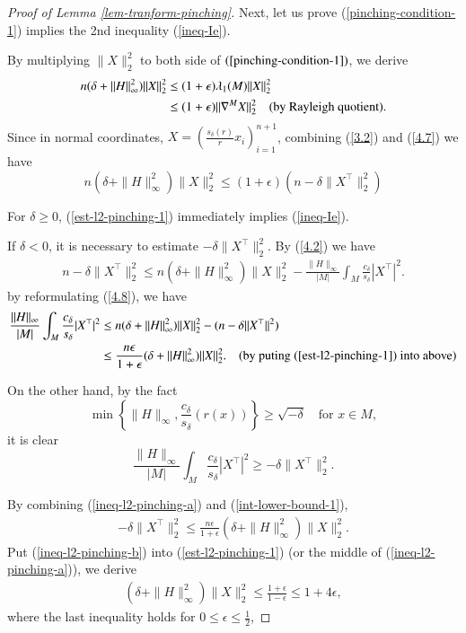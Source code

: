 \documentclass{amsart}
\numberwithin{equation}{section}
\theoremstyle{remark}
\renewcommand{\(}{\left(}
\renewcommand{\)}{\right)}
\renewcommand{\~}{\tilde}
\renewcommand{\-}{\overline}
\renewcommand{\d}{\delta}
\newcommand{\e}{\epsilon}
\renewcommand{\l}{\lambda}
\begin{document}
\begin{proof}[Proof of Lemma \ref{lem-tranform-pinching}]
	Next, let us prove (\ref{pinching-condition-1}) implies the 2nd inequality (\ref{ineq-Ie}).
	
	By multiplying $\|X\|_2^2$ to both side of $(\ref{pinching-condition-1})$, we derive
	\begin{align}
	n(\d+\|H\|_\infty^2)\|X\|_2^2 &\leq (1+\e)\l_1(M)\|X\|_2^2 \notag\\
	& \leq (1+\e)\|\nabla^M X\|_2^2 \quad (\text{by Rayleigh quotient}).\label{4.7}
	\end{align}
	Since in normal coordinates, $X=(\frac{s_\d(r)}{r}x_i)_{i=1}^{n+1}$, combining
	(\ref{3.2}) and (\ref{4.7}) we have
	\begin{equation}\label{est-l2-pinching-1}
	n(\d+\|H\|_\infty^2)\|X\|_2^2 \leq  (1+\e)(n-\d\|X^\top\|_2^2)
	\end{equation}
	
	For $\d \geq 0$, (\ref{est-l2-pinching-1}) immediately implies (\ref{ineq-Ie}).
	
	
	If $\d<0$, it is necessary to estimate $-\d \|X^\top \|_2^2$. By (\ref{4.2}) we have
	\begin{align}\label{4.8}
	n-\d\|X^\top\|_2^2 \leq n(\d+\|H\|_\infty^2)\|X\|_2^2-\frac{\|H\|_\infty}{|M|}\int_M \frac{ c_\d}{ s_\d}|X^\top|^2.
	\end{align}
	by reformulating (\ref{4.8}), we have
	\begin{align}
	\frac{\|H\|_\infty}{|M|}\int_M \frac{ c_\d}{ s_\d}|X^\top|^2 &\leq n(\d+\|H\|_\infty^2)\|X\|_2^2-(n-\d\|X^\top\|^2)\nonumber\\
	&\leq \frac{n\e}{1+\e}(\d+\|H\|_\infty^2)\|X\|_2^2. \quad \text{(by puting (\ref{est-l2-pinching-1}) into above)} \label{ineq-l2-pinching-a}
	\end{align}
		
	On the other hand, by the fact
	$$\min\left\{\|H\|_\infty, \frac{c_\d}{s_\d}(r(x))\right\} \geq \sqrt{-\d}  \quad\text{for $x\in M$},$$ it is clear
	\begin{equation}\label{int-lower-bound-1}
	\frac{\|H\|_\infty}{|M|}\int_M \frac{ c_\d}{ s_\d}|X^\top|^2\ge -\d\|X^\top\|_2^2.
	\end{equation}
	
	By combining (\ref{ineq-l2-pinching-a}) and (\ref{int-lower-bound-1}),
	\begin{align}\label{ineq-l2-pinching-b}
	-\d\|X^\top\|_2^2\leq\frac{n\e}{1+\e}(\d+\|H\|_\infty^2)\|X\|_2^2.
	\end{align}
	Put (\ref{ineq-l2-pinching-b}) into (\ref{est-l2-pinching-1}) (or the middle of (\ref{ineq-l2-pinching-a})), we derive
	\begin{align*}
	(\d+\|H\|_\infty^2)\|X\|_2^2 \leq \frac{1+\e}{1-\e} \leq 1+4\e,
	\end{align*}
	where the last inequality holds for $0\le \e\le \frac{1}{2}$,
\end{proof}
\end{document}
